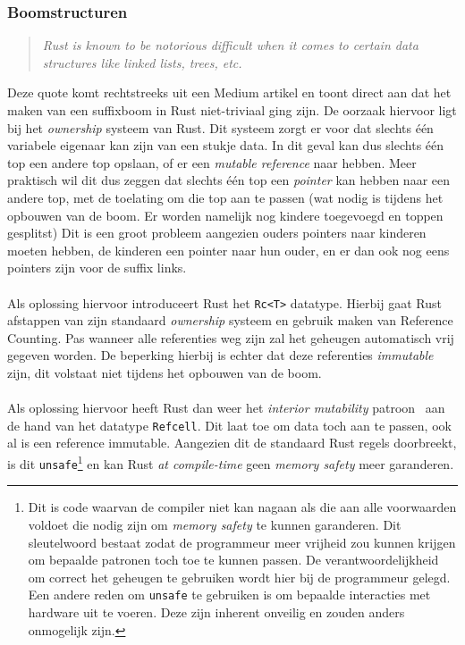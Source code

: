 \subsubsection{Boomstructuren}
\begin{quote}
    \textit{Rust is known to be notorious difficult when it comes to certain data structures like linked lists, trees, etc. \cite{rust_difficulty_quote}}
\end{quote}
Deze quote komt rechtstreeks uit een Medium artikel en toont direct aan dat het maken van een suffixboom in Rust niet-triviaal ging zijn.
De oorzaak hiervoor ligt bij het \textit{ownership} systeem van Rust.
Dit systeem zorgt er voor dat slechts één variabele eigenaar kan zijn van een stukje data.
In dit geval kan dus slechts één top een andere top opslaan, of er een \textit{mutable reference} naar hebben.
Meer praktisch wil dit dus zeggen dat slechts één top een \textit{pointer} kan hebben naar een andere top, met de toelating om die top aan te passen (wat nodig is tijdens het opbouwen van de boom. Er worden namelijk nog kindere toegevoegd en toppen gesplitst)
Dit is een groot probleem aangezien ouders pointers naar kinderen moeten hebben, de kinderen een pointer naar hun ouder, en er dan ook nog eens pointers zijn voor de suffix links.
\\ \\
Als oplossing hiervoor introduceert Rust het \texttt{Rc<T>} datatype.
Hierbij gaat Rust afstappen van zijn standaard \textit{ownership} systeem en gebruik maken van Reference Counting.
Pas wanneer alle referenties weg zijn zal het geheugen automatisch vrij gegeven worden.
De beperking hierbij is echter dat deze referenties \textit{immutable} zijn, dit volstaat niet tijdens het opbouwen van de boom.
\\ \\
Als oplossing hiervoor heeft Rust dan weer het \textit{interior mutability} patroon~\cite{interior_mutability} aan de hand van het datatype \texttt{Refcell}.
Dit laat toe om data toch aan te passen, ook al is een reference immutable.
Aangezien dit de standaard Rust regels doorbreekt, is dit \texttt{unsafe}\footnote{Dit is code waarvan de compiler niet kan nagaan als die aan alle voorwaarden voldoet die nodig zijn om \textit{memory safety} te kunnen garanderen. Dit sleutelwoord bestaat zodat de programmeur meer vrijheid zou kunnen krijgen om bepaalde patronen toch toe te kunnen passen. De verantwoordelijkheid om correct het geheugen te gebruiken wordt hier bij de programmeur gelegd. Een andere reden om \texttt{unsafe} te gebruiken is om bepaalde interacties met hardware uit te voeren. Deze zijn inherent onveilig en zouden anders onmogelijk zijn.} en kan Rust \textit{at compile-time} geen \textit{memory safety} meer garanderen.
